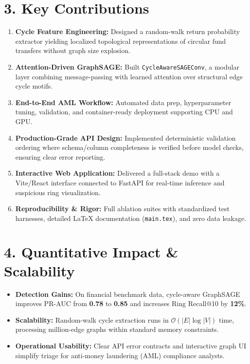 \documentclass[10pt]{article}
\begin{document}
\section*{3. Key Contributions}
\begin{enumerate}
  \item \textbf{Cycle Feature Engineering:} Designed a random-walk return probability extractor yielding localized topological representations of circular fund transfers without graph size explosion.
  \item \textbf{Attention-Driven GraphSAGE:} Built \texttt{CycleAwareSAGEConv}, a modular layer combining message-passing with learned attention over structural edge cycle motifs.
  \item \textbf{End-to-End AML Workflow:} Automated data prep, hyperparameter tuning, validation, and container-ready deployment supporting CPU and GPU.
  \item \textbf{Production-Grade API Design:} Implemented deterministic validation ordering where schema/column completeness is verified before model checks, ensuring clear error reporting.
  \item \textbf{Interactive Web Application:} Delivered a full-stack demo with a Vite/React interface connected to FastAPI for real-time inference and suspicious ring visualization.
  \item \textbf{Reproducibility \& Rigor:} Full ablation suites with standardized test harnesses, detailed LaTeX documentation (\texttt{main.tex}), and zero data leakage.
\end{enumerate}

\section*{4. Quantitative Impact \& Scalability}
\begin{itemize}
  \item \textbf{Detection Gains:} On financial benchmark data, cycle-aware GraphSAGE improves PR-AUC from \textbf{0.78} to \textbf{0.85} and increases Ring Recall@10 by \textbf{12\%}.
  \item \textbf{Scalability:} Random-walk cycle extraction runs in $\mathcal{O}(|E| \log |V|)$ time, processing million-edge graphs within standard memory constraints.
  \item \textbf{Operational Usability:} Clear API error contracts and interactive graph UI simplify triage for anti-money laundering (AML) compliance analysts.
\end{itemize}
\end{document}
